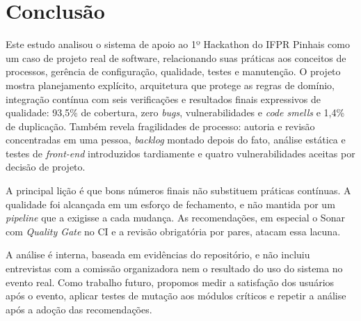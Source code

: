 \section{Conclusão}
\label{sec:conc}

Este estudo analisou o sistema de apoio ao 1º Hackathon do IFPR Pinhais como um caso de projeto real de software, relacionando suas práticas aos conceitos de processos, gerência de configuração, qualidade, testes e manutenção. O projeto mostra planejamento explícito, arquitetura que protege as regras de domínio, integração contínua com seis verificações e resultados finais expressivos de qualidade: 93,5\% de cobertura, zero \textit{bugs}, vulnerabilidades e \textit{code smells} e 1,4\% de duplicação. Também revela fragilidades de processo: autoria e revisão concentradas em uma pessoa, \textit{backlog} montado depois do fato, análise estática e testes de \textit{front-end} introduzidos tardiamente e quatro vulnerabilidades aceitas por decisão de projeto.

A principal lição é que bons números finais não substituem práticas contínuas. A qualidade foi alcançada em um esforço de fechamento, e não mantida por um \textit{pipeline} que a exigisse a cada mudança. As recomendações, em especial o Sonar com \textit{Quality Gate} no CI e a revisão obrigatória por pares, atacam essa lacuna.

A análise é interna, baseada em evidências do repositório, e não incluiu entrevistas com a comissão organizadora nem o resultado do uso do sistema no evento real. Como trabalho futuro, propomos medir a satisfação dos usuários após o evento, aplicar testes de mutação aos módulos críticos e repetir a análise após a adoção das recomendações.
